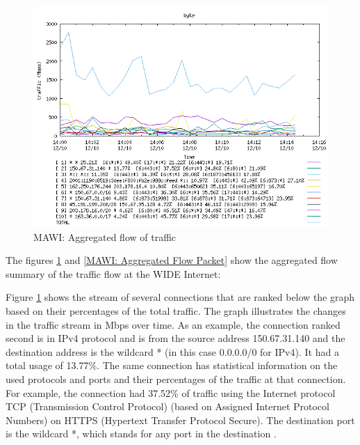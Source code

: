 \documentclass[sigconf,authorversion,nonacm]{acmart}
\begin{document}
\begin{figure}
        \centering
        \includegraphics[width=1\linewidth]{MAWI/MAWI 2023-12-10 aggregated analysis byte.png}
        \caption{MAWI: Aggregated flow of traffic}
        \label{MAWI: Aggregated Flow Byte}
\end{figure}

The figures \ref{MAWI: Aggregated Flow Byte} and \ref{MAWI: Aggregated Flow Packet} show the aggregated flow summary of the traffic flow at the WIDE Internet:

Figure \ref{MAWI: Aggregated Flow Byte} shows the stream of several connections that are ranked below the graph based on their percentages of the total traffic. The graph illustrates the changes in the traffic stream in Mbps over time. As an example, the connection ranked second is in IPv4 protocol and is from the source address 150.67.31.140 and the destination address is the wildcard * (in this case 0.0.0.0/0 for IPv4). It had a total usage of 13.77\%. The same connection has statistical information on the used protocols and ports and their percentages of the traffic at that connection. For example, the connection had 37.52\% of traffic using the Internet protocol TCP (Transmission Control Protocol) (based on Assigned Internet Protocol Numbers) on HTTPS (Hypertext Transfer Protocol Secure). The destination port is the wildcard *, which stands for any port in the destination \cite{179442}.
\end{document}

